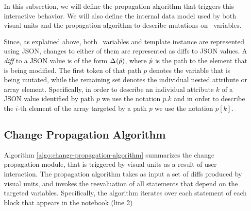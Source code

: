 In this subsection, we will define the propagation algorithm that triggers this interactive behavior. We will also define the internal data model used by both visual units and the propagation algorithm to describe mutations on \projname\ variables.


 Since, as explained above, both \projname\ variables and template instance are represented using JSON, changes to either of them are represented as diffs to JSON values. A \emph{diff} to a JSON value is of the form $\Delta^{}_{}(\hat{p})$, where $\hat{p}$ is the path to the element that is being modified. The first token of that path $p$ denotes the variable that is being mutated, while the remaining set denotes the individual nested attribute or array element. Specifically, in order to describe an individual attribute $k$ of a JSON value identified by path $p$ we use the notation $p.k$ and in order to describe the $i$-th element of the array targeted by a path $p$ we use the notation $p[k]$.

\subsection{Change Propagation Algorithm}
\label{section:change-propagation-algorithm}

Algorithm \ref{algo:change-propagation-algorithm} summarizes the change propagation module, that is triggered by visual units as a result of user interaction. The propagation algorithm takes as input a set of diffs produced by visual units, and invokes the reevaluation of all statements that depend on the targeted variables. Specifically, the algorithm iterates over each statement of each block that appears in the notebook (line 2)


